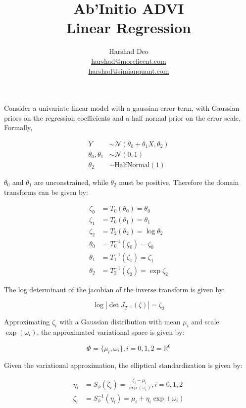 \documentclass[10pt]{article}
\title{Ab'Initio ADVI \\ Linear Regression}
\author{Harshad Deo \\ 
  \href{mailto:harshad@moreficent.com}{harshad@moreficent.com} \\ 
  \href{mailto:harshad@simianquant.com}{harshad@simianquant.com}
}
\date{}
\begin{document}
  
\maketitle

Consider a univariate linear model with a gaussian error term, with Gaussian priors on the regression coefficients and 
a half normal prior on the error scale. Formally,

\begin{align*}
  Y &\sim \mathcal{N}(\theta_0 + \theta_1 X, \theta_2) \\
  \theta_0, \theta_1 &\sim \mathcal{N}(0, 1) \\
  \theta_2 &\sim \text{HalfNormal}(1)
\end{align*}

$\theta_0$ and $\theta_1$ are unconstrained, while $\theta_2$ must be positive. Therefore the domain transforms 
can be given by:

\begin{align*}
  \zeta_0 &= T_0(\theta_0) = \theta_0 \\
  \zeta_1 &= T_0(\theta_1) = \theta_1 \\
  \zeta_2 &= T_2(\theta_2) = \log \theta_2 \\
  \theta_0 &= T^{-1}_0(\zeta_0) = \zeta_0 \\
  \theta_1 &= T^{-1}_1(\zeta_1) = \zeta_1 \\
  \theta_2 &= T^{-1}_2(\zeta_2) = \exp \zeta_2
\end{align*}

The log determinant of the jacobian of the inverse transform is given by:

\begin{equation*}
  \log|\det J_{T^{-1}}(\zeta)| = \zeta_2
\end{equation*}

Approximating $\zeta_i$ with a Gaussian distribution with mean $\mu_i$ and scale $\exp(\omega_i)$, the approximated 
variational space is given by:

\begin{equation*}
  \Phi = \{\mu_i, \omega_i\}, i = 0, 1, 2 = \mathbb{R}^6
\end{equation*}


Given the variational approximation, the elliptical standardization is given by:

\begin{align*}
  \eta_i &= S_{\phi}(\zeta_i) = \frac{\zeta_i - \mu_i}{\exp(\omega_i)}, i = 0, 1, 2 \\
  \zeta_i &= S_{\phi}^{-1}(\eta_i) = \mu_i + \eta_i \exp(\omega_i)
\end{align*}
\end{document}
